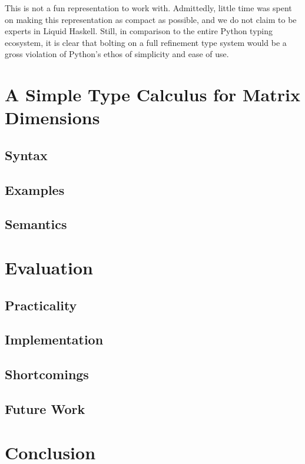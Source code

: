 \documentclass{article}
\begin{document}
This is not a fun representation to work with. Admittedly, little time was spent on making this representation as compact as possible, and we do not claim to be experts in Liquid Haskell. Still, in comparison to the entire Python typing ecosystem, it is clear that bolting on a full refinement type system would be a gross violation of Python's ethos of simplicity and ease of use.

\section{A Simple Type Calculus for Matrix Dimensions}



\subsection{Syntax}

\subsection{Examples}

\subsection{Semantics}

\section{Evaluation}

\subsection{Practicality}

\subsection{Implementation}

\subsection{Shortcomings}

\subsection{Future Work}

\section{Conclusion}
\end{document}
